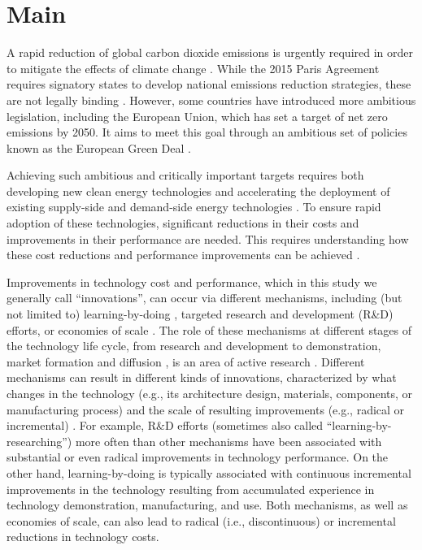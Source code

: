 \documentclass[parskip=full]{article}
\begin{document}
\section{Main}
\label{sec:intro}

A rapid reduction of global carbon dioxide emissions is urgently required in order to mitigate the effects of climate change \cite{Forster2019}. While the 2015 Paris Agreement requires signatory states to develop national emissions reduction strategies, these are not legally binding \cite{bodansky2016legal}. However, some countries have introduced more ambitious legislation, including the European Union, which has set a target of net zero emissions by 2050. It aims to meet this goal through an ambitious set of policies known as the European Green Deal \cite{eu2020green}.

Achieving such ambitious and critically important targets requires both developing new clean energy technologies \cite{iea2020cleanenergy} and accelerating the deployment of existing supply-side \cite{sinn2012green} and demand-side energy technologies \cite{rgeVorsatz2009}. To ensure rapid adoption of these technologies, significant reductions in their costs and improvements in their performance are needed. This requires understanding how these cost reductions and performance improvements can be achieved \cite{nemet2019solar,Stephan2021,kavlak2018evaluating,Ziegler2021}.

Improvements in technology cost and performance, which in this study we generally call “innovations”, can occur via different mechanisms, including (but not limited to) learning-by-doing \cite{WRIGHT_1936, Arrow_1962}, targeted research and development (R\&D) efforts, or economies of scale \cite{johansson2012global, iea2020perspectives}. The role of these mechanisms at different stages of the technology life cycle, from research and development to demonstration, market formation and diffusion \cite{grubler2012policies}, is an area of active research \cite{kavlak2018evaluating,Ziegler2021}. Different mechanisms can result in different kinds of innovations, characterized by what changes in the technology (e.g., its architecture design, materials, components, or manufacturing process) and the scale of resulting improvements (e.g., radical or incremental) \cite{Garcia_2002}. For example, R\&D efforts (sometimes also called “learning-by-researching”) \cite{Cohen_1989} more often than other mechanisms have been associated with substantial or even radical improvements in technology performance. On the other hand, learning-by-doing is typically associated with continuous incremental improvements in the technology resulting from accumulated experience in technology demonstration, manufacturing, and use. Both mechanisms, as well as economies of scale, can also lead to radical (i.e., discontinuous) or incremental reductions in technology costs. 
\end{document}
